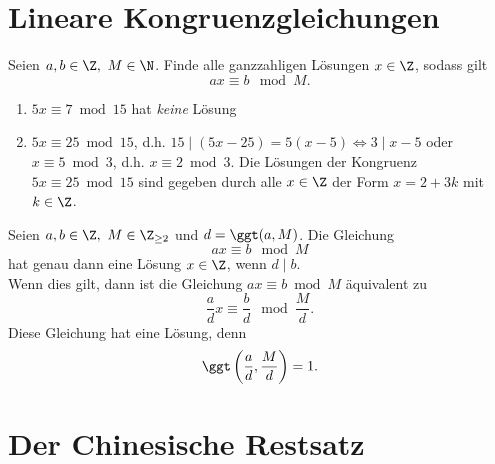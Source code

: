 \section*{Lineare Kongruenzgleichungen}

\begin{frage*}
	Seien $a,b \in \Z,\ M \in \N$. Finde alle ganzzahligen Lösungen $x \in \Z$, sodass gilt
	\[ ax \equiv b \mod M. \]
\end{frage*}

\begin{exmp*}
	\begin{enumerate}[label={\roman*})]
		\item \( 5x \equiv 7 \bmod 15 \) hat \textit{keine} Lösung
		\item \( 5x \equiv 25 \bmod 15 \), d.h. \( 15 \mid (5x - 25) = 5(x-5) \iff 3 \mid x-5 \) oder \( x \equiv 5 \bmod 3 \), d.h. \( x \equiv 2 \bmod 3 \). Die Lösungen der Kongruenz \( 5x \equiv 25 \bmod 15 \) sind gegeben durch alle $x \in \Z$ der Form $x = 2+3k$ mit $k \in \Z$.
	\end{enumerate}
\end{exmp*}

\begin{thm}\autolabel
	Seien $a,b \in \Z,\ M \in \Z_{\geq 2}$ und $d = \ggt(a,M)$. Die Gleichung
	\[ ax \equiv b \mod M \]
	hat genau dann eine Lösung $x \in \Z$, wenn $d \mid b$.\\
	Wenn dies gilt, dann ist die Gleichung $ax \equiv b \bmod M$ äquivalent zu 
	\[ \frac{a}{d} x \equiv \frac{b}{d} \mod \frac{M}{d}. \]
	Diese Gleichung hat eine Lösung, denn
	\[ \ggt \left( \frac{a}{d}, \frac{M}{d} \right) = 1. \]
\end{thm}

\section*{Der Chinesische Restsatz}

